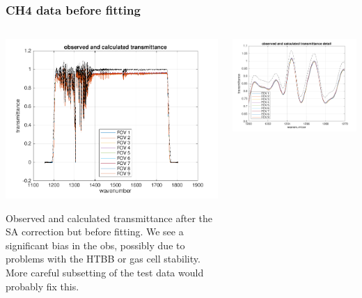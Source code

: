 \documentclass[10pt]{beamer}
\begin{document}
\begin{frame}
\frametitle{CH4 data before fitting}
\begin{columns}[t]
\begin{column}{0.5\textwidth}  
  \begin{centering}
  \includegraphics[width=\textwidth]{figures/spec_test2_CH4_all.png}
  \end{centering}\vspace{3mm}

Observed and calculated transmittance after the SA correction but
before fitting.  We see a significant bias in the obs, possibly due
to problems with the HTBB or gas cell stability.  More careful
subsetting of the test data would probably fix this.

\end{column}

\begin{column}{0.5\textwidth}
  \begin{centering}
  \includegraphics[width=\textwidth]{figures/spec_test2_CH4_zoom.png}
  \end{centering}\vspace{3mm}


\end{column}
\end{columns}
\end{frame}
\end{document}
